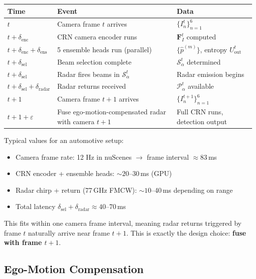 \documentclass[12pt, a4paper]{article}
\newcommand{\beamset}{\mathcal{S}}
\newcommand{\FI}{\mathbf{F}_{I}}
\newcommand{\Uout}{U_{\mathrm{out}}}
\theoremstyle{definition}
\begin{document}
\begin{center}
\renewcommand{\arraystretch}{1.5}
\begin{tabular}{lll}
  \toprule
  \textbf{Time} & \textbf{Event} & \textbf{Data} \\
  \midrule
  $t$ & Camera frame $t$ arrives & $\{I_n^t\}_{n=1}^6$ \\
  $t + \delta_\mathrm{enc}$ & CRN camera encoder runs & $\FI^t$ computed \\
  $t + \delta_\mathrm{enc} + \delta_\mathrm{ens}$ & 5 ensemble heads run (parallel)
    & $\{\hat{p}^{(m)}\}$, entropy $\Uout^t$ \\
  $t + \delta_\mathrm{sel}$ & Beam selection complete
    & $\beamset_\alpha^t$ determined \\
  $t + \delta_\mathrm{sel}$ & Radar fires beams in $\beamset_\alpha^t$
    & Radar emission begins \\
  $t + \delta_\mathrm{sel} + \delta_\mathrm{radar}$ & Radar returns received
    & $\mathcal{P}^t_\alpha$ available \\
  $t+1$ & Camera frame $t+1$ arrives & $\{I_n^{t+1}\}_{n=1}^6$ \\
  $t+1 + \varepsilon$ & Fuse ego-motion-compensated radar with camera $t+1$
    & Full CRN runs, detection output \\
  \bottomrule
\end{tabular}
\end{center}

\begin{plainbox}
Typical values for an automotive setup:
\begin{itemize}
  \item Camera frame rate: 12 Hz in nuScenes $\to$ frame interval $\approx 83$\,ms
  \item CRN encoder + ensemble heads: $\sim 20$--30\,ms (GPU)
  \item Radar chirp + return (77\,GHz FMCW): $\sim 10$--40\,ms depending on range
  \item Total latency $\delta_\mathrm{sel} + \delta_\mathrm{radar} \approx 40$--70\,ms
\end{itemize}
This fits within one camera frame interval, meaning radar returns triggered by
frame $t$ naturally arrive near frame $t+1$.
This is exactly the design choice: \textbf{fuse with frame $t+1$}.
\end{plainbox}

\subsection{Ego-Motion Compensation}
\end{document}
